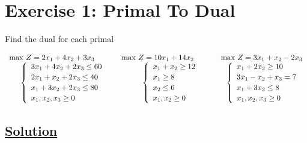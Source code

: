 \section*{Exercise 1: Primal To Dual}
Find the dual for each primal

\vspace{0.5cm}



\[
\begin{array}{c@{\hspace{1.25cm}}c@{\hspace{1.25cm}}c}
    \text{max } Z = 2x_1 + 4x_2 + 3x_3 & \text{max } Z = 10x_1 + 14x_2 & \text{max } Z = 3x_1 + x_2 - 2x_3 \\[0pt]
    
    \multicolumn{1}{c}{
    \left\{
    \begin{array}{l}
        3x_{1} + 4x_{2} + 2x_{3}\leq 60 \\[2pt]
        2x_{1} + x_{2} + 2x_{3}\leq 40 \\[2pt]
        x_{1} + 3x_{2} + 2x_{3} \leq 80 \\[2pt]
        x_{1}, x_{2}, x_{3}\geq 0
    \end{array}
    \right.
    } 
    &
    \multicolumn{1}{c}{
    \left\{
    \begin{array}{l}
        x_{1} + x_{2} \geq 12 \\[2pt]
        x_{1}\geq 8 \\[2pt]
        x_{2} \leq 6 \\[2pt]
        x_{1}, x_{2}\geq 0
    \end{array}
    \right.
    }
    &
    \multicolumn{1}{c}{
    \left\{
    \begin{array}{l}
        x_{1} + 2x_{2} \geq 10 \\[2pt]
        3x_{1} - x_{2} + x_{3} = 7 \\[2pt]
        x_{1} + 3x_{2}  \leq 8 \\[2pt]
        x_{1}, x_{2}, x_{3}\geq 0
    \end{array}
    \right.
    }  %
\end{array}
\]


\vspace{1cm}

\subsection*{\underline{Solution}}

